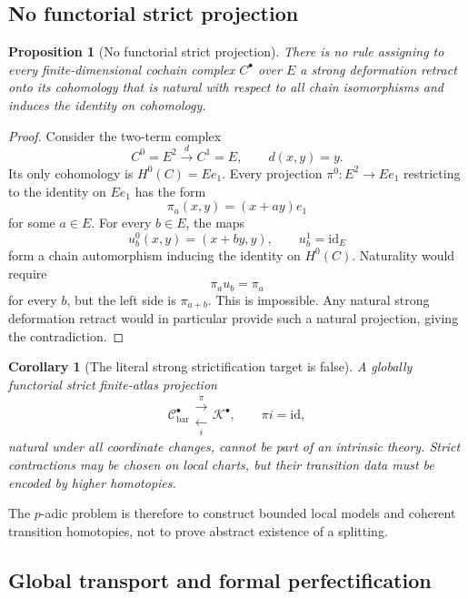 \documentclass[11pt]{article}
\newtheorem{proposition}[theorem]{Proposition}
\newtheorem{corollary}[theorem]{Corollary}
\theoremstyle{definition}
\newcommand{\cC}{\mathcal C}
\begin{document}
\subsection{No functorial strict projection}

\begin{proposition}[No functorial strict projection]\label{prop:no-functorial-projection}
There is no rule assigning to every finite-dimensional cochain complex $C^\bullet$ over $E$ a strong deformation retract onto its cohomology that is natural with respect to all chain isomorphisms and induces the identity on cohomology.
\end{proposition}

\begin{proof}
Consider the two-term complex
\[
C^0=E^2\xrightarrow{\ d\ }C^1=E,
\qquad
d(x,y)=y.
\]
Its only cohomology is $H^0(C)=E e_1$.  Every projection $\pi^0:E^2\to Ee_1$ restricting to the identity on $Ee_1$ has the form
\[
\pi_a(x,y)=(x+ay)e_1
\]
for some $a\in E$.  For every $b\in E$, the maps
\[
u_b^0(x,y)=(x+by,y),
\qquad
u_b^1=\mathrm{id}_E
\]
form a chain automorphism inducing the identity on $H^0(C)$.  Naturality would require
\[
\pi_a u_b=\pi_a
\]
for every $b$, but the left side is $\pi_{a+b}$.  This is impossible.  Any natural strong deformation retract would in particular provide such a natural projection, giving the contradiction.
\end{proof}

\begin{corollary}[The literal strong strictification target is false]\label{cor:strict-target-false}
A globally functorial strict finite-atlas projection
\[
\cC^\bullet_{\mathrm{bar}}
\substack{\xrightarrow{\ \pi\ }\\[-5pt]\xleftarrow[\ i\ ]{}}
\mathcal K^\bullet,
\qquad
\pi i=\mathrm{id},
\]
natural under all coordinate changes, cannot be part of an intrinsic theory.  Strict contractions may be chosen on local charts, but their transition data must be encoded by higher homotopies.
\end{corollary}

The $p$-adic problem is therefore to construct bounded local models and coherent transition homotopies, not to prove abstract existence of a splitting.

\subsection{Global transport and formal perfectification}
\end{document}
